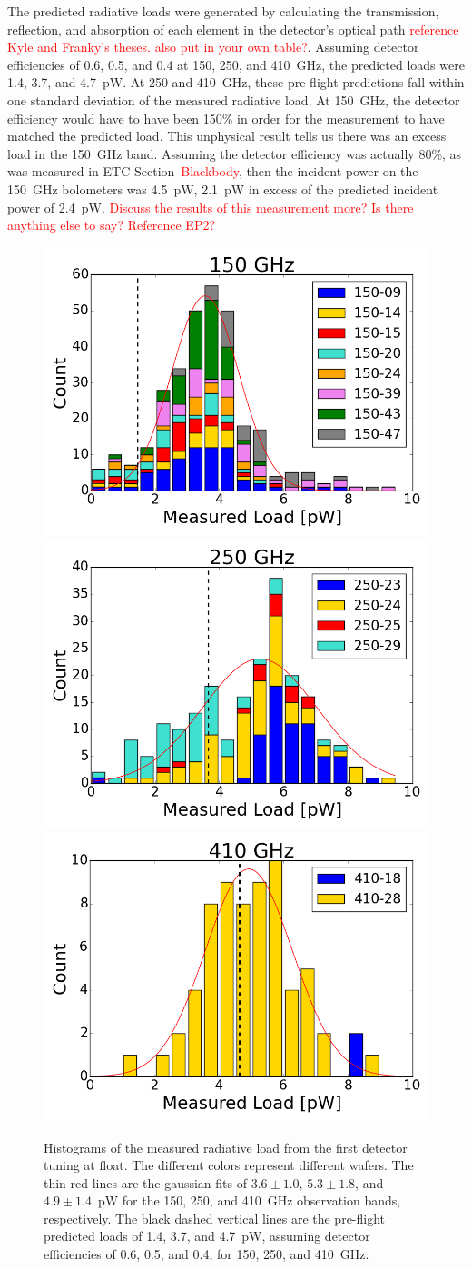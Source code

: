 The predicted radiative loads were generated by calculating the transmission, reflection, and absorption of each element in the detector's optical path \textcolor{red}{reference Kyle and Franky's theses. also put in your own table?}. 
Assuming detector efficiencies of 0.6, 0.5, and 0.4 at 150, 250, and 410~GHz, the predicted loads were 1.4, 3.7, and 4.7~pW.
At 250 and 410~GHz, these pre-flight predictions fall within one standard deviation of the measured radiative load. 
At 150~GHz, the detector efficiency would have to have been 150\% in order for the measurement to have matched the predicted load. 
This unphysical result tells us there was an excess load in the 150~GHz band. 
Assuming the detector efficiency was actually 80\%, as was measured in \ac{ETC} Section~\textcolor{red}{Blackbody}, then the incident power on the 150~GHz bolometers was 4.5~pW, 2.1~pW in excess of the predicted incident power of 2.4~pW. 
\textcolor{red}{Discuss the results of this measurement more? Is there anything else to say? Reference EP2?}

\begin{figure}[ht!]
\begin{center}
\includegraphics[width=0.32\columnwidth]{figures/thesis_150_radiative_load_hist.png}
\includegraphics[width=0.32\columnwidth]{figures/thesis_250_radiative_load_hist.png}
\includegraphics[width=0.32\columnwidth]{figures/thesis_410_radiative_load_hist.png}
\caption{Histograms of the measured radiative load from the first detector tuning at float. 
The different colors represent different wafers.  
The thin red lines are the gaussian fits of $3.6\pm1.0, \, 5.3\pm1.8$, and $4.9\pm1.4$~pW for the 150, 250, and 410~GHz observation bands, respectively. 
The black dashed vertical lines are the pre-flight predicted loads of 1.4, 3.7, and 4.7~pW, assuming detector efficiencies of 0.6, 0.5, and 0.4, for 150, 250, and 410~GHz. 
\label{fig:radiative_load_histograms} }
\end{center}
\end{figure}


